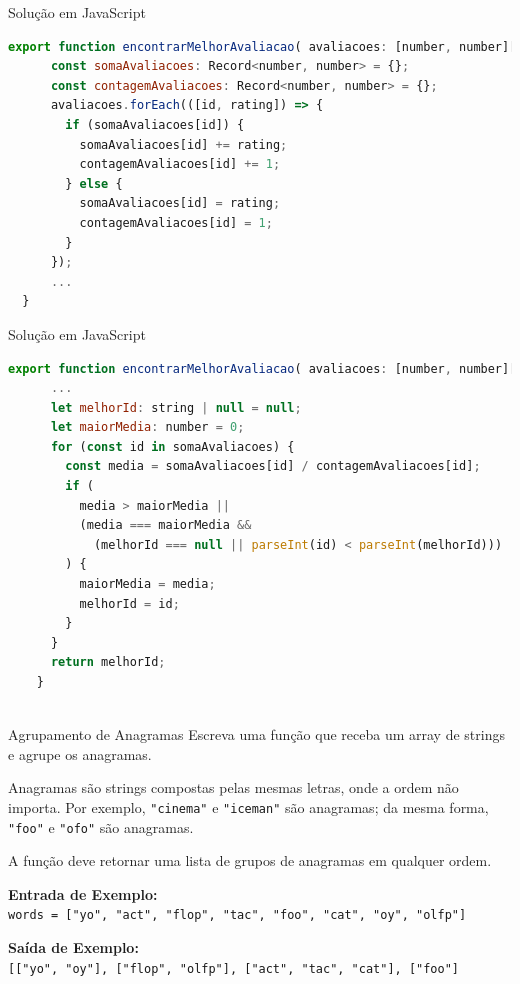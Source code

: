 \begin{frame}[fragile]{Solução em JavaScript}
  \begin{lstlisting}[language=JavaScript]
    export function encontrarMelhorAvaliacao( avaliacoes: [number, number][] ): string | null {
      const somaAvaliacoes: Record<number, number> = {};
      const contagemAvaliacoes: Record<number, number> = {};
      avaliacoes.forEach(([id, rating]) => {
        if (somaAvaliacoes[id]) {
          somaAvaliacoes[id] += rating;
          contagemAvaliacoes[id] += 1;
        } else {
          somaAvaliacoes[id] = rating;
          contagemAvaliacoes[id] = 1;
        }
      });
      ...
  }
  \end{lstlisting}
\end{frame}
\begin{frame}[fragile]{Solução em JavaScript}
  \begin{lstlisting}[language=JavaScript]
    export function encontrarMelhorAvaliacao( avaliacoes: [number, number][] ): string | null {
      ...
      let melhorId: string | null = null;
      let maiorMedia: number = 0;
      for (const id in somaAvaliacoes) {
        const media = somaAvaliacoes[id] / contagemAvaliacoes[id];
        if (
          media > maiorMedia ||
          (media === maiorMedia &&
            (melhorId === null || parseInt(id) < parseInt(melhorId)))
        ) {
          maiorMedia = media;
          melhorId = id;
        }
      }
      return melhorId;
    }
    
  \end{lstlisting}
  \end{frame}
  
\begin{frame}[fragile]{Agrupamento de Anagramas}
  Escreva uma função que receba um array de strings e agrupe os anagramas.
  
  Anagramas são strings compostas pelas mesmas letras, onde a ordem não importa. Por exemplo, \texttt{"cinema"} e \texttt{"iceman"} são anagramas; da mesma forma, \texttt{"foo"} e \texttt{"ofo"} são anagramas.
  
  A função deve retornar uma lista de grupos de anagramas em qualquer ordem.

  \textbf{Entrada de Exemplo:}\\
  \texttt{words = ["yo", "act", "flop", "tac", "foo", "cat", "oy", "olfp"]}

  \textbf{Saída de Exemplo:}\\
  \texttt{{[["yo", "oy"], ["flop", "olfp"], ["act", "tac", "cat"], ["foo"]}}
\end{frame}
  
